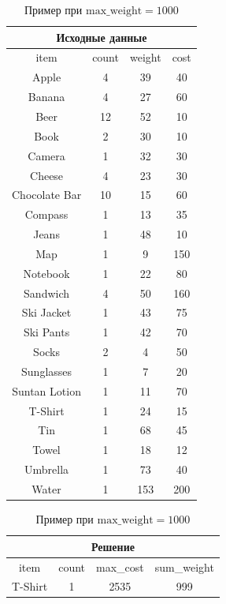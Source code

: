 \documentclass[12pt, a4paper]{article}
\begin{document}
	\begin{table}[H]
		\footnotesize
		\centering		
		\caption{Пример при $\textrm{max\_weight}=1000$}\medskip
		\begin{tabular}{|c|c|c|c|}
			\hline
			\multicolumn{4}{|c|}{\textbf{Исходные данные}}\\
			\hline
			\rowcolor{Gray}
			item & count & weight & cost \\
			\hline
			Apple & 4 & 39 & 40 \\
			\hline
			Banana & 4 & 27 & 60 \\
			\hline
			Beer & 12 & 52 & 10 \\
			\hline
			Book & 2 & 30 & 10 \\
			\hline
			Camera & 1 & 32 & 30 \\
			\hline
			Cheese & 4 & 23 & 30\\
			\hline
			Chocolate Bar & 10 & 15 & 60\\
			\hline
			Compass & 1 & 13 & 35\\
			\hline
			Jeans & 1 & 48 & 10\\
			\hline
			Map & 1 & 9 & 150\\
			\hline
			Notebook & 1 & 22 & 80\\
			\hline
			Sandwich & 4 & 50 & 160\\
			\hline
			Ski Jacket & 1 & 43 & 75\\
			\hline
			Ski Pants & 1 & 42 & 70\\
			\hline
			Socks & 2 & 4 & 50\\
			\hline
			Sunglasses & 1 & 7 & 20\\
			\hline
			Suntan Lotion & 1 & 11 & 70\\
			\hline
			T-Shirt & 1 & 24 & 15\\
			\hline
			Tin & 1 & 68 & 45\\
			\hline
			Towel & 1 & 18 & 12 \\
			\hline
			Umbrella & 1 & 73 & 40\\
			\hline
			Water & 1 & 153 & 200\\
			\hline
		\end{tabular}
		\;
		\begin{tabular}{|c|c|c|c|}
			\hline
			\multicolumn{4}{|c|}{\textbf{Решение}}\\
			\hline
			\rowcolor{Gray}
			item & count & max\_cost & sum\_weight \\
			\hline
			T-Shirt & 1 &  \multirow{15}{*}{\large 2535} & \multirow{15}{*}{\large 999}  \\

\end{tabular}
\end{table}
\end{document}

